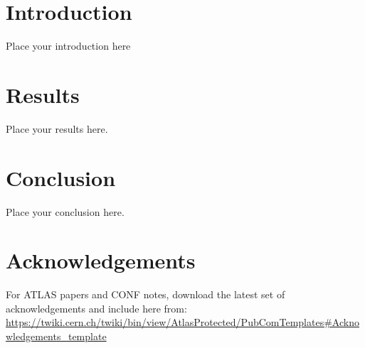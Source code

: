 \documentclass{style/atlasdoc}
\begin{document}

% 

%


\section{Introduction}
\label{sec:intro}

Place your introduction here


% 


\section{Results}
\label{sec:result}

Place your results here.


\section{Conclusion}
\label{sec:conclusion}

Place your conclusion here.


\section*{Acknowledgements}

For ATLAS papers and CONF notes, download the latest set of acknowledgements and include here from:
\url{https://twiki.cern.ch/twiki/bin/view/AtlasProtected/PubComTemplates#Acknowledgements_template}



\end{document}
